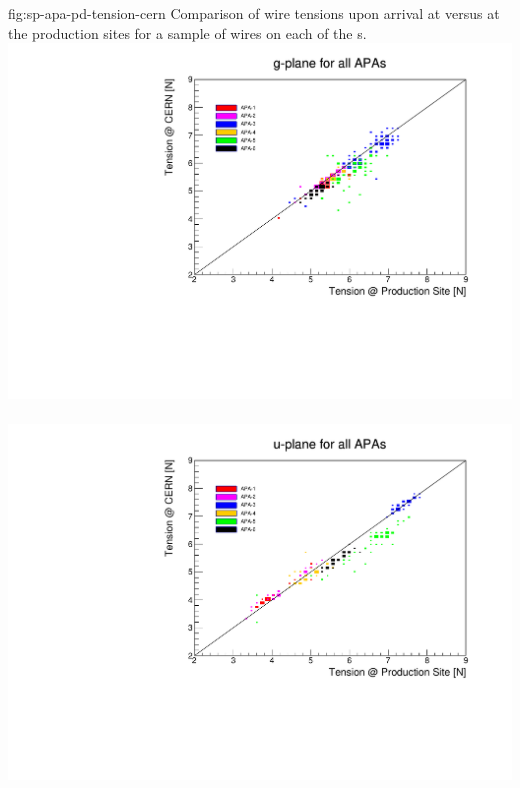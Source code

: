 \begin{dunefigure}{fig:sp-apa-pd-tension-cern}
{Comparison of wire tensions upon arrival at  versus at the production sites for a sample of wires on each of the  s.}
\mbox{\includegraphics[height=0.23\textheight]{graphics/sp-apa-PD-tension-prod-cern-G.pdf} %
\includegraphics[height=0.23\textheight]{graphics/sp-apa-PD-tension-prod-cern-U.pdf}} \\
\vspace{3mm}

\end{dunefigure}

